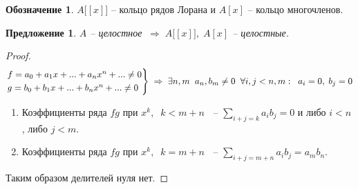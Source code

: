 \documentclass[12pt, a4paper]{article}
\newcommand{\ra}{\;\Rightarrow\;}
\theoremstyle{plain}
\newtheorem*{Proposition*}{Предложение}
\theoremstyle{definition}
\newtheorem*{Designation*}{Обозначение}
\begin{document}
\begin{Designation*}
    $A\big[[x]\big]$ -- кольцо рядов Лорана и $A[x]$ -- кольцо многочленов.
\end{Designation*}
\begin{Proposition*}
    $A$ -- целостное$\;\ra A\big[[x]\big],\; A[x]$ -- целостные.
\end{Proposition*}
\begin{proof}

\begin{equation*}
    \begin{rcases}
        f = a_0+a_1x+...+a_nx^n+... \neq 0\\
        g = b_0+b_1x+...+b_nx^n+... \neq 0
    \end{rcases}
    \ra \exists n,m\;\; a_n, b_m\neq 0\;\; \forall i,j < n,m:\;\;a_i = 0,\; b_j = 0
\end{equation*}
\begin{enumerate}
    \item Коэффициенты ряда $fg$ при $x^k,\;\; k<m+n\;\;$ -- $\sum\limits_{i+j=k}a_ib_j = 0$ и либо $i<n$, либо $j<m$.
    \item Коэффициенты ряда $fg$ при $x^k,\;\; k=m+n\;\;$ -- $\sum\limits_{i+j=m+n}a_ib_j = a_mb_n$. 
\end{enumerate}
    Таким образом делителей нуля нет.
\end{proof}
\end{document}
